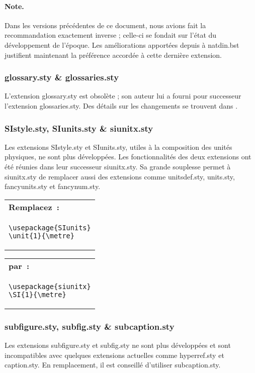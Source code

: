 \documentclass[fontsize=11pt, paper=a4, pagesize, captions=tableheading, numbers=enddot, toc=graduated, footnotes=multiple]{scrartcl}%
\makeatletter
\newcommand{\Paket}[1]{\textsf{#1.sty}\xspace}
\newcommand{\PakeH}[1]{#1.sty\xspace}
\newcommand{\Bst}[1]{\textsf{#1.bst}\xspace}
\newenvironment{Ers}[1][\linewidth]{%
  \par\bigskip\noindent\marginline{\textcolor{gruen}{\boldmath $\triangleright$}}\begin{tabular}[t]{@{}p{0.5\textwidth}@{}}\textcolor{rot}{\textbf{\textsf{Remplacez~:}}%
}\\[2pt] \rahmenpr[#1]}%
{\endrahmenpr\end{tabular}}
\newenvironment{Dur}[1][0.5\textwidth]{%
\noindent\begin{tabular}[t]{@{}p{0.5\textwidth - 0.5em}@{}}\textcolor{gruen}{\textbf{\textsf{par~:}}}\\[2pt]\rahmenpg[#1]}%
{\endrahmenpg\end{tabular}\smallskip\noindent}
\makeatother
\begin{document}
\paragraph{Note.}
Dans les versions précédentes de ce document, nous avions fait la recommandation exactement inverse ; celle-ci se fondait sur l’état du développement de l’époque. Les améliorations apportées depuis à \Bst{natdin} justifient maintenant la préférence accordée à cette dernière extension.

\subsubsection{\PakeH{glossary} \& \PakeH{glossaries}}
\label{sec:glossar}

L’extension \Paket{glossary} est obsolète ; son auteur lui a fourni pour successeur l’extension \Paket{glossaries}. Des détails sur les changements se trouvent dans \cite{glossaries-12}.

\subsubsection{\PakeH{SIstyle}, \PakeH{SIunits} \& \PakeH{siunitx}}
\label{sec:einheiten}

Les extensions \Paket{SIstyle} et \Paket{SIunits}, utiles à la composition des unités physiques, ne sont plus développées. Les fonctionnalités des deux extensions ont été réunies dans leur successeur \Paket{siunitx}. Sa grande souplesse permet à \Paket{siunitx} de remplacer aussi des extensions comme \Paket{unitsdef}, \Paket{units}, \Paket{fancyunits} et \Paket{fancynum}.
\begin{Ers}
\begin{verbatim}
\usepackage{SIunits}
\unit{1}{\metre}
\end{verbatim}
\end{Ers}
\begin{Dur}
\begin{verbatim}
\usepackage{siunitx}
\SI{1}{\metre}
\end{verbatim}
\end{Dur}

\subsubsection{\PakeH{subfigure}, \PakeH{subfig} \& \PakeH{subcaption}}
\label{sec:subfigures}

Les extensions \Paket{subfigure} et \Paket{subfig} ne sont plus développées et sont incompatibles avec quelques extensions actuelles comme \Paket{hyperref} et \Paket{caption}. En remplacement, il est conseillé d’utiliser \Paket{subcaption}.
\end{document}
